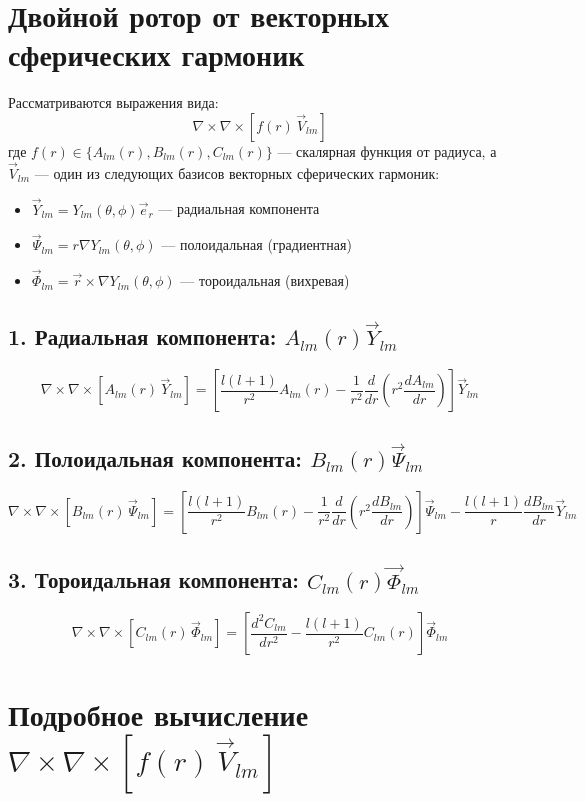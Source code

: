 \documentclass{article}
\begin{document}
\section*{Двойной ротор от векторных сферических гармоник}

Рассматриваются выражения вида:
\[
\nabla \times \nabla \times \left[ f(r)\, \vec{V}_{lm} \right]
\]
где \( f(r) \in \{A_{lm}(r), B_{lm}(r), C_{lm}(r) \} \) — скалярная функция от радиуса, а \( \vec{V}_{lm} \) — один из следующих базисов векторных сферических гармоник:

\begin{itemize}
    \item \( \vec{Y}_{lm} = Y_{lm}(\theta, \phi) \vec{e}_r \) — радиальная компонента
    \item \( \vec{\Psi}_{lm} = r \nabla Y_{lm}(\theta, \phi) \) — полоидальная (градиентная)
    \item \( \vec{\Phi}_{lm} = \vec{r} \times \nabla Y_{lm}(\theta, \phi) \) — тороидальная (вихревая)
\end{itemize}

\subsection*{1. Радиальная компонента: \( A_{lm}(r) \vec{Y}_{lm} \)}
\[
\nabla \times \nabla \times \left[ A_{lm}(r)\, \vec{Y}_{lm} \right] =
\left[
\frac{l(l+1)}{r^2} A_{lm}(r)
- \frac{1}{r^2} \frac{d}{dr}\left( r^2 \frac{dA_{lm}}{dr} \right)
\right] \vec{Y}_{lm}
\]

\subsection*{2. Полоидальная компонента: \( B_{lm}(r) \vec{\Psi}_{lm} \)}
\[
\nabla \times \nabla \times \left[ B_{lm}(r)\, \vec{\Psi}_{lm} \right] =
\left[
\frac{l(l+1)}{r^2} B_{lm}(r)
- \frac{1}{r^2} \frac{d}{dr} \left( r^2 \frac{dB_{lm}}{dr} \right)
\right] \vec{\Psi}_{lm}
- \frac{l(l+1)}{r} \frac{d B_{lm}}{dr} \vec{Y}_{lm}
\]

\subsection*{3. Тороидальная компонента: \( C_{lm}(r) \vec{\Phi}_{lm} \)}
\[
\nabla \times \nabla \times \left[ C_{lm}(r)\, \vec{\Phi}_{lm} \right] =
\left[
\frac{d^2 C_{lm}}{dr^2}
- \frac{l(l+1)}{r^2} C_{lm}(r)
\right] \vec{\Phi}_{lm}
\]


\section*{Подробное вычисление $\nabla \times \nabla \times [f(r)\, \vec{V}_{lm}]$}
\end{document}
